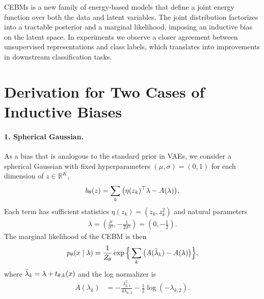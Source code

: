 \documentclass[tablecaption=bottom,wcp]{jmlr} %
\begin{document}
CEBMs is a new family of energy-based models that define a joint energy function over both the data and latent variables. The joint distribution factorizes into a tractable posterior and a marginal likelihood, imposing an inductive bias on the latent space. In experiments we observe a closer agreement between unsupervised representations and class labels, which translates into improvements in downstream classification tasks. 




\appendix
\newpage
\section{Derivation for Two Cases of Inductive Biases}
\label{appendix-sec:inductive-bias}
\paragraph{1. Spherical Gaussian.} As a bias that is analogous to the standard prior in VAEs, we consider a spherical Gaussian with fixed hyperparameters $(\mu,\sigma)=(0,1)$ for each dimension of $z \in \mathbb{R}^K$,
\begin{align*}
    b_\theta(z) = \sum_{k} \big( \eta(z_k)^\top \lambda - A(\lambda) \big),
\end{align*}
Each term has sufficient statistics $\eta(z_k) = (z_k, z_k^2)$ and natural parameters
\begin{align}
   \lambda = 
   \left(
      \frac{\mu}{\sigma^2},
      -\frac{1}{2\sigma^2}
   \right)
   =
   \left(
      0,
      -\frac{1}{2}
   \right)
   .
\end{align}
The marginal likelihood of the CEBM is then
\begin{align}
    p_\theta(x \mid \lambda) 
    =
    \frac{1}{Z_\theta}
    \exp \Big\{
      \sum_{k} \big(A(\tilde{\lambda}_k) - A(\lambda)\big)
    \Big\},
\end{align}
where $\tilde{\lambda}_k = \lambda + t_{\theta,k}(x)$ and the log normalizer is
\begin{align*}
    A(\lambda_k) 
    &=
    -\frac{\lambda_{k,1}^2}{4 \lambda_{k,2}}
    -
    \frac{1}{2} \log (-\lambda_{k,2})
    .
\end{align*}
\end{document}
